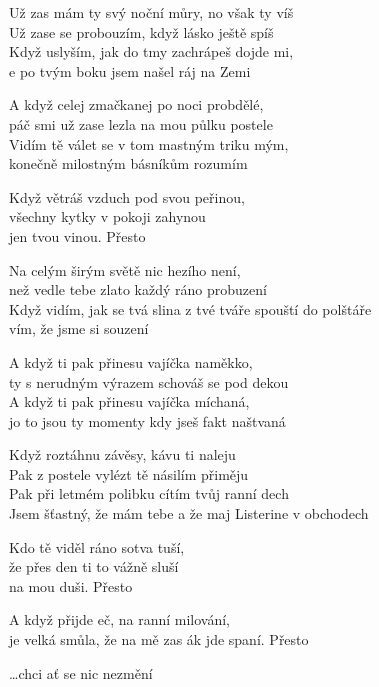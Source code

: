 
\ve{}
Už zas mám ty svý noční můry, no však ty víš\\
Už zase se probouzím, když lásko ještě spíš\\
Když uslyším, jak do tmy zachrápeš dojde mi,\\
e po tvým boku jsem našel ráj na Zemi

\ve{}
A když celej zmačkanej po noci probdělé,\\
páč smi už zase lezla na mou půlku postele\\
Vidím tě válet se v tom mastným triku mým,\\
konečně milostným básníkům rozumím

\re{}
Když větráš vzduch pod svou peřinou,\\
všechny kytky v pokoji zahynou\\
jen tvou vinou. Přesto

\cho{}
Na celým širým světě nic hezího není,\\
než vedle tebe zlato každý ráno probuzení\\
Když vidím, jak se tvá slina z tvé tváře spouští do polštáře\\
vím, že jsme si souzení

\ve{}
A když ti pak přinesu vajíčka naměkko,\\
ty s nerudným výrazem schováš se pod dekou\\
A když ti pak přinesu vajíčka míchaná,\\
jo to jsou ty momenty kdy jseš fakt naštvaná

\ve{}
Když roztáhnu závěsy, kávu ti naleju\\
Pak z postele vylézt tě násilím přiměju\\
Pak při letmém polibku cítím tvůj ranní dech\\
Jsem šťastný, že mám tebe a že maj Listerine v obchodech

\re{}
Kdo tě viděl ráno sotva tuší,\\
že přes den ti to vážně sluší \\
na mou duši. Přesto

\cho{}
\cho{}

\ve{}
A když přijde eč, na ranní milování,\\
je velká smůla, že na mě zas ák jde spaní. Přesto

\cho{}

\cho{}
\ldots{}chci ať se nic nezmění

\esong{}